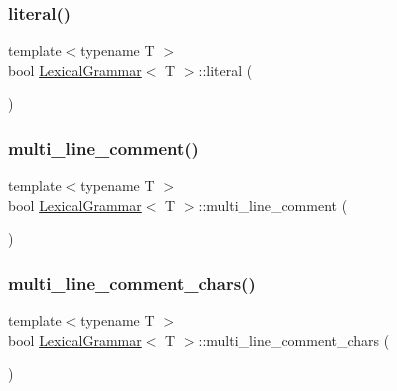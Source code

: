 \mbox{\label{class_lexical_grammar_aae192a9c337028f4edbfe210e587d2dc}} 
\subsubsection{\texorpdfstring{literal()}{literal()}}
{\footnotesize\ttfamily template$<$typename T $>$ \\
bool \hyperlink{class_lexical_grammar}{Lexical\+Grammar}$<$ T $>$\+::literal (\begin{DoxyParamCaption}{ }\end{DoxyParamCaption})\hspace{0.3cm}{\ttfamily [inline]}}

\mbox{\label{class_lexical_grammar_a9a4018bef475f8831e825ccc199a0baa}} 
\subsubsection{\texorpdfstring{multi\+\_\+line\+\_\+comment()}{multi\_line\_comment()}}
{\footnotesize\ttfamily template$<$typename T $>$ \\
bool \hyperlink{class_lexical_grammar}{Lexical\+Grammar}$<$ T $>$\+::multi\+\_\+line\+\_\+comment (\begin{DoxyParamCaption}{ }\end{DoxyParamCaption})\hspace{0.3cm}{\ttfamily [inline]}}

\mbox{\label{class_lexical_grammar_a4f847dd31fc9ea84af23f03a7cf507eb}} 
\subsubsection{\texorpdfstring{multi\+\_\+line\+\_\+comment\+\_\+chars()}{multi\_line\_comment\_chars()}}
{\footnotesize\ttfamily template$<$typename T $>$ \\
bool \hyperlink{class_lexical_grammar}{Lexical\+Grammar}$<$ T $>$\+::multi\+\_\+line\+\_\+comment\+\_\+chars (\begin{DoxyParamCaption}{ }\end{DoxyParamCaption})\hspace{0.3cm}{\ttfamily [inline]}}

